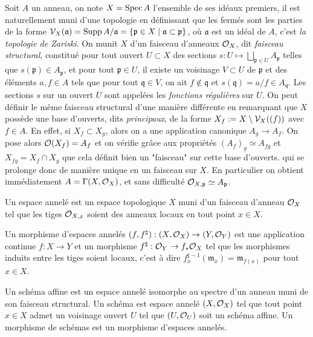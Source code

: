 Soit $A$ un anneau, on note $X=\operatorname{Spec} A$ l'ensemble de ses idéaux premiers, il est naturellement muni d'une topologie en définissant que les fermés sont les parties de la forme $\mathcal{V}_X(\mathfrak{a})=\operatorname{Supp} A/\mathfrak{a}=\lbrace \mathfrak{p}\in X\mid \mathfrak{a}\subset \mathfrak{p}\rbrace$, où $\mathfrak{a}$ est un idéal de $A$, c'est \textit{la topologie de Zariski}. On munit $X$ d'un faisceau d'anneaux $\mathcal{O}_X$, dit \textit{faisceau structural}, constitué pour tout ouvert $U\subset X$ des sections $s: U\mapsto \bigsqcup_{\mathfrak{p}\in U}A_\mathfrak{p}$ telles que $s(\mathfrak{p})\in A_\mathfrak{p}$, et pour tout $\mathfrak{p}\in U$, il existe un voisinage $V\subset U$ de $\mathfrak{p}$ et des éléments $a,f\in A$ tels que pour tout $\mathfrak{q}\in V$, on ait $f\notin \mathfrak{q}$ et $s(\mathfrak{q})=a/f\in A_\mathfrak{q}$. Les sections $s$ sur un ouvert $U$ sont appelées les \textit{fonctions régulières} sur $U$. On peut définir le même faisceau structural d'une manière différente en remarquant que $X$ possède une base d'ouverts, dits \textit{principaux}, de la forme $X_f:=X\setminus \mathcal{V}_X((f))$ avec $f\in A$. En effet, si $X_f\subset X_g$, alors on a une application canonique $A_g\rightarrow A_f$. On pose alors $\mathcal{O}(X_f)=A_f$ et on vérifie grâce aux propriétés $(A_f)_g\simeq A_{fg}$ et $X_{fg}=X_f\cap X_g$ que cela définit bien un "faisceau" sur cette base d'ouverts. qui se prolonge donc de manière unique en un faisceau sur $X$. En particulier on obtient immédiatement $A=\Gamma(X, \mathcal{O}_X)$, et sans difficulté $\mathcal{O}_{X,\mathfrak{p}}\simeq A_\mathfrak{p}$. 

\begin{defn}
Un espace annelé est un espace topologique $X$ muni d'un faisceau d'anneau $\mathcal{O}_X$ tel que les tiges $\mathcal{O}_{X,x}$ soient des anneaux locaux en tout point $x\in X$.

Un morphisme d'espaces annelés $(f, f^\sharp):(X,\mathcal{O}_X)\rightarrow (Y,\mathcal{O}_Y)$ est une application continue $f:X\rightarrow Y$ et un morphisme $f^\sharp:\mathcal{O}_Y\rightarrow f_*\mathcal{O}_X$ tel que les morphismes induits entre les tiges soient locaux, c'est à dire $f^{\sharp -1}_x(\mathfrak{m}_x)=\mathfrak{m}_{f(x)}$ pour tout $x\in X$.
\end{defn}

\begin{defn}
Un schéma affine est un espace annelé isomorphe au spectre d'un anneau muni de son faisceau structural. Un schéma est espace annelé $(X,\mathcal{O}_X)$ tel que tout point $x\in X$ admet un voisinage ouvert $U$ tel que $(U,\mathcal{O}_U)$ soit un schéma affine. Un morphisme de schémas est un morphisme d'espaces annelés.
\end{defn}

